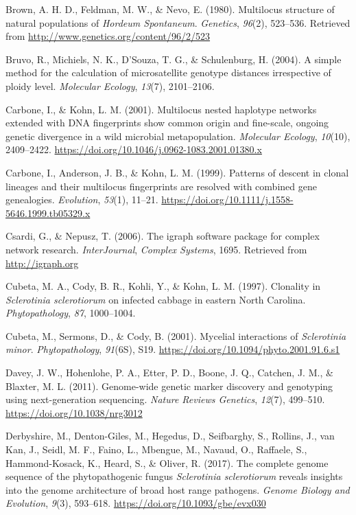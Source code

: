 \hypertarget{ref-brown1980multilocus}{}
Brown, A. H. D., Feldman, M. W., \& Nevo, E. (1980). Multilocus
structure of natural populations of \emph{Hordeum Spontaneum}.
\emph{Genetics}, \emph{96}(2), 523--536. Retrieved from
\url{http://www.genetics.org/content/96/2/523}

\hypertarget{ref-bruvo2004simple}{}
Bruvo, R., Michiels, N. K., D'Souza, T. G., \& Schulenburg, H. (2004). A
simple method for the calculation of microsatellite genotype distances
irrespective of ploidy level. \emph{Molecular Ecology}, \emph{13}(7),
2101--2106.

\hypertarget{ref-carbone2001multilocus}{}
Carbone, I., \& Kohn, L. M. (2001). Multilocus nested haplotype networks
extended with DNA fingerprints show common origin and fine-scale,
ongoing genetic divergence in a wild microbial metapopulation.
\emph{Molecular Ecology}, \emph{10}(10), 2409--2422.
\url{https://doi.org/10.1046/j.0962-1083.2001.01380.x}

\hypertarget{ref-carbone1999patterns}{}
Carbone, I., Anderson, J. B., \& Kohn, L. M. (1999). Patterns of descent
in clonal lineages and their multilocus fingerprints are resolved with
combined gene genealogies. \emph{Evolution}, \emph{53}(1), 11--21.
\url{https://doi.org/10.1111/j.1558-5646.1999.tb05329.x}

\hypertarget{ref-csardi2006igraph}{}
Csardi, G., \& Nepusz, T. (2006). The igraph software package for
complex network research. \emph{InterJournal}, \emph{Complex Systems},
1695. Retrieved from \url{http://igraph.org}

\hypertarget{ref-cubeta1997clonality}{}
Cubeta, M. A., Cody, B. R., Kohli, Y., \& Kohn, L. M. (1997). Clonality
in \emph{Sclerotinia sclerotiorum} on infected cabbage in eastern North
Carolina. \emph{Phytopathology}, \emph{87}, 1000--1004.

\hypertarget{ref-cubeta2001mycelial}{}
Cubeta, M., Sermons, D., \& Cody, B. (2001). Mycelial interactions of
\emph{Sclerotinia minor}. \emph{Phytopathology}, \emph{91}(6S), S19.
\url{https://doi.org/10.1094/phyto.2001.91.6.s1}

\hypertarget{ref-davey2011genome}{}
Davey, J. W., Hohenlohe, P. A., Etter, P. D., Boone, J. Q., Catchen, J.
M., \& Blaxter, M. L. (2011). Genome-wide genetic marker discovery and
genotyping using next-generation sequencing. \emph{Nature Reviews
Genetics}, \emph{12}(7), 499--510. \url{https://doi.org/10.1038/nrg3012}

\hypertarget{ref-derbyshire2017complete}{}
Derbyshire, M., Denton-Giles, M., Hegedus, D., Seifbarghy, S., Rollins,
J., van Kan, J., Seidl, M. F., Faino, L., Mbengue, M., Navaud, O.,
Raffaele, S., Hammond-Kosack, K., Heard, S., \& Oliver, R. (2017). The
complete genome sequence of the phytopathogenic fungus \emph{Sclerotinia
sclerotiorum} reveals insights into the genome architecture of broad
host range pathogens. \emph{Genome Biology and Evolution}, \emph{9}(3),
593--618. \url{https://doi.org/10.1093/gbe/evx030}

